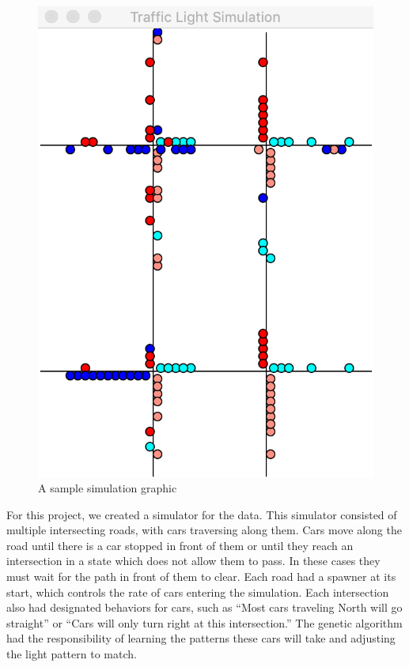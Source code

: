 \documentclass[12pt, letterpaper]{article}
\begin{document}
\begin{figure}
\begin{center}
	\includegraphics[scale=0.5]{screenshot.png}
	\caption{A sample simulation graphic}
\end{center}
\end{figure}

For this project, we created a simulator for the data.
This simulator consisted of multiple intersecting roads, with cars traversing along them.
Cars move along the road until there is a car stopped in front of them or until they reach an intersection in a state which does not allow them to pass.
In these cases they must wait for the path in front of them to clear.
Each road had a spawner at its start, which controls the rate of cars entering the simulation.
Each intersection also had designated behaviors for cars, such as ``Most cars traveling North will go straight'' or ``Cars will only turn right at this intersection.''
The genetic algorithm had the responsibility of learning the patterns these cars will take and adjusting the light pattern to match.
\end{document}
